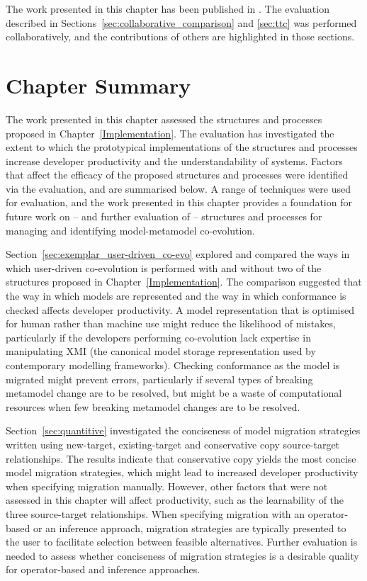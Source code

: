 The work presented in this chapter has been published in \cite{rose10comparison,rose10ttc_solution,rose10ttc_case}. The evaluation described in Sections~\ref{sec:collaborative_comparison} and \ref{sec:ttc} was performed collaboratively, and the contributions of others are highlighted in those sections.








\section{Chapter Summary}
The work presented in this chapter assessed the structures and processes proposed in Chapter~\ref{Implementation}. The evaluation has investigated the extent to which the prototypical implementations of the structures and processes increase developer productivity and the understandability of systems. Factors that affect the efficacy of the proposed structures and processes were identified via the evaluation, and are summarised below. A range of techniques were used for evaluation, and the work presented in this chapter provides a foundation for future work on -- and further evaluation of -- structures and processes for managing and identifying model-metamodel co-evolution.

Section~\ref{sec:exemplar_user-driven_co-evo} explored and compared the ways in which user-driven co-evolution is performed with and without two of the structures proposed in Chapter~\ref{Implementation}. The comparison suggested that the way in which models are represented and the way in which conformance is checked affects developer productivity. A model representation that is optimised for human rather than machine use might reduce the likelihood of mistakes, particularly if the developers performing co-evolution lack expertise in manipulating XMI (the canonical model storage representation used by contemporary modelling frameworks). Checking conformance as the model is migrated might prevent errors, particularly if several types of breaking metamodel change are to be resolved, but might be a waste of computational resources when few breaking metamodel changes are to be resolved.

Section~\ref{sec:quantitive} investigated the conciseness of model migration strategies written using new-target, existing-target and conservative copy source-target relationships. The results indicate that conservative copy yields the most concise model migration strategies, which might lead to increased developer productivity when specifying migration manually. However, other factors that were not assessed in this chapter will affect productivity, such as the learnability of the three source-target relationships. When specifying migration with an operator-based or an inference approach, migration strategies are typically presented to the user to facilitate selection between feasible alternatives. Further evaluation is needed to assess whether conciseness of migration strategies is a desirable quality for operator-based and inference approaches.
 
